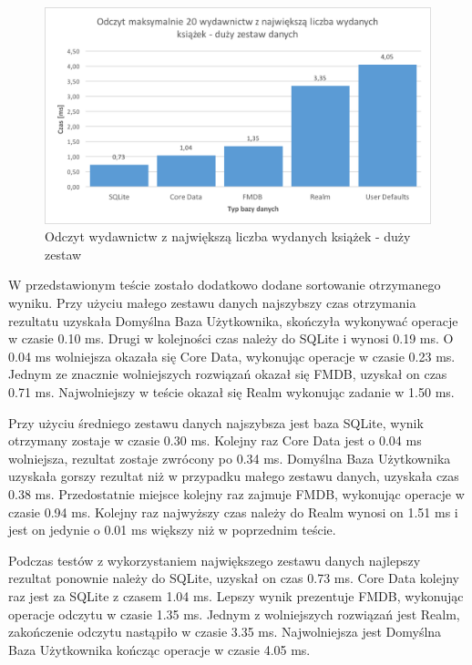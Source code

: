 \begin{figure}[H]
\centering
	\includegraphics[width=13.5cm]{img/read_data/read_by_publishers/read_by_publishers_big_test.png}
	\caption{Odczyt wydawnictw z największą liczba wydanych książek - duży zestaw}
	\label{fig: read-by-publishers-big}
\end{figure}

W przedstawionym teście zostało dodatkowo dodane sortowanie otrzymanego wyniku. Przy użyciu małego zestawu danych najszybszy czas otrzymania rezultatu uzyskała Domyślna Baza Użytkownika, skończyła wykonywać operacje w czasie 0.10 ms. Drugi w kolejności czas należy do SQLite i wynosi 0.19 ms. O 0.04 ms wolniejsza okazała się Core Data, wykonując operacje w czasie 0.23 ms. Jednym ze znacznie wolniejszych rozwiązań okazał się FMDB, uzyskał on czas 0.71 ms. Najwolniejszy w teście okazał się Realm wykonując zadanie w 1.50 ms.\par

Przy użyciu średniego zestawu danych najszybsza jest baza SQLite, wynik otrzymany zostaje w czasie 0.30 ms. Kolejny raz Core Data jest o 0.04 ms wolniejsza, rezultat zostaje zwrócony po 0.34 ms. Domyślna Baza Użytkownika uzyskała gorszy rezultat niż w przypadku małego zestawu danych, uzyskała czas 0.38 ms. Przedostatnie miejsce kolejny raz zajmuje FMDB, wykonując operacje w czasie 0.94 ms. Kolejny raz najwyższy czas należy do Realm wynosi on 1.51 ms i jest on jedynie o 0.01 ms większy niż w poprzednim teście.\par

Podczas testów z wykorzystaniem największego zestawu danych najlepszy rezultat ponownie należy do SQLite, uzyskał on czas 0.73 ms. Core Data kolejny raz jest za SQLite z czasem 1.04 ms. Lepszy wynik prezentuje FMDB, wykonując operacje odczytu w czasie 1.35 ms. Jednym z wolniejszych rozwiązań jest Realm, zakończenie odczytu nastąpiło w czasie 3.35 ms. Najwolniejsza jest Domyślna Baza Użytkownika kończąc operacje w czasie 4.05 ms. 

